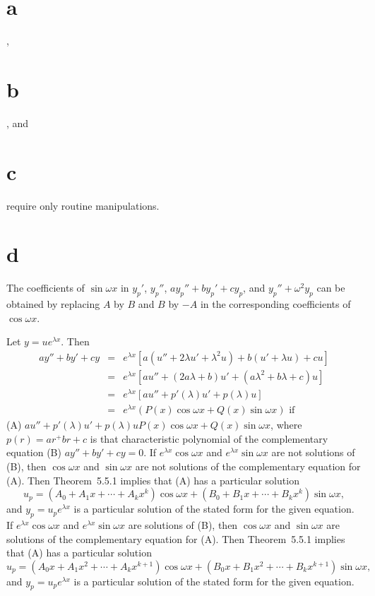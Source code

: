 \documentclass[dvips]{book}
\renewcommand{\exer}[1]{\par\medskip\;\noindent{\color{red}\bf #1.}}
\numberwithin{example}{section}
\numberwithin{equation}{section}
\numberwithin{theorem}{section}
\numberwithin{table}{section}
\numberwithin{figure}{section}
\begin{document}
\exer{5.5.36}
\part{a}, \part{b}, and \part{c} require only routine
manipulations.
\part{d}
The coefficients of $\sin\omega x$ in
$y_p'$, $y_p''$, $ay_p''+by_p'+cy_p$,
and $y_p''+\omega^2 y_p$  can be obtained by replacing $A$ by $B$
and $B$ by $-A$ in the corresponding coefficients of $\cos\omega x$.



\exer{5.5.38}
Let $y=ue^{\lambda x}$. Then
\begin{eqnarray*}
ay''+by'+cy&=&e^{\lambda x}\left[a(u''+2\lambda u'+\lambda^2u)
+b(u'+\lambda u)+cu\right]\\
&=&e^{\lambda
x}\left[au''+(2a\lambda+b)u'+(a\lambda^2+b\lambda+c)u\right]\\
&=&e^{\lambda x}\left[au''+p'(\lambda)u'+p(\lambda)u\right]\\
&=&e^{\lambda x}\left(P(x)\cos \omega x+Q(x)\sin \omega x\right)
\mbox{ if}
\end{eqnarray*}
(A) $au''+p'(\lambda)u'+p(\lambda)u
P(x)\cos \omega x+Q(x)\sin \omega x$,
where $p(r)=ar^+br+c$ is that characteristic polynomial
of the  complementary equation (B) $ay''+by'+cy=0$.
If $e^{\lambda x}\cos\omega x$ and $e^{\lambda
x}\sin\omega x$ are not solutions of (B), then
$\cos\omega x$ and $\sin\omega x$ are not solutions of the
complementary equation for (A).  Then  Theorem~5.5.1
implies that  (A) has a particular solution
$$
u_p=(A_0+A_1x+\cdots+A_kx^k)\cos\omega x+
(B_0+B_1x+\cdots+B_kx^k)\sin\omega x,
$$
 and $y_p=u_pe^{\lambda x}$
is a particular solution of the stated form for the given equation.
If $e^{\lambda x}\cos\omega x$ and $e^{\lambda
x}\sin\omega x$ are  solutions of (B), then
$\cos\omega x$ and $\sin\omega x$ are solutions of the
complementary equation for (A).  Then  Theorem~5.5.1
implies that  (A) has a particular solution
$$
u_p=(A_0x+A_1x^2+\cdots+A_kx^{k+1})\cos\omega x+
(B_0x+B_1x^2+\cdots+B_kx^{k+1})\sin\omega x,
$$
and $y_p=u_pe^{\lambda x}$ is a particular solution of the stated form
for the given equation.
\end{document}
